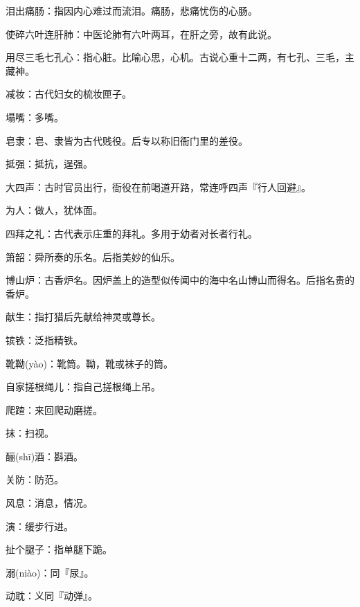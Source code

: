 \startbuffer[1221]
泪出痛肠：指因内心难过而流泪。痛肠，悲痛忧伤的心肠。
\stopbuffer


\startbuffer[1222]
使碎六叶连肝肺：中医论肺有六叶两耳，在肝之旁，故有此说。
\stopbuffer


\startbuffer[1223]
用尽三毛七孔心：指心脏。比喻心思，心机。古说心重十二两，有七孔、三毛，主藏神。
\stopbuffer


\startbuffer[1224]
减妆：古代妇女的梳妆匣子。
\stopbuffer


\startbuffer[1225]
塌嘴：多嘴。
\stopbuffer


\startbuffer[1226]
皂隶：皂、隶皆为古代贱役。后专以称旧衙门里的差役。
\stopbuffer


\startbuffer[1227]
抵强：抵抗，逞强。
\stopbuffer


\startbuffer[1228]
大四声：古时官员出行，衙役在前喝道开路，常连呼四声『行人回避』。
\stopbuffer


\startbuffer[1229]
为人：做人，犹体面。
\stopbuffer


\startbuffer[1230]
四拜之礼：古代表示庄重的拜礼。多用于幼者对长者行礼。
\stopbuffer


\startbuffer[1231]
箫韶：舜所奏的乐名。后指美妙的仙乐。
\stopbuffer


\startbuffer[1232]
博山炉：古香炉名。因炉盖上的造型似传闻中的海中名山博山而得名。后指名贵的香炉。
\stopbuffer


\startbuffer[1233]
献生：指打猎后先献给神灵或尊长。
\stopbuffer


\startbuffer[1234]
镔铁：泛指精铁。
\stopbuffer


\startbuffer[1235]
靴靿(yào)：靴筒。靿，靴或袜子的筒。
\stopbuffer


\startbuffer[1236]
自家搓根绳儿：指自己搓根绳上吊。
\stopbuffer


\startbuffer[1237]
爬蹅：来回爬动磨搓。
\stopbuffer


\startbuffer[1238]
抹：扫视。
\stopbuffer


\startbuffer[1239]
酾(shī)酒：斟酒。
\stopbuffer


\startbuffer[1240]
关防：防范。
\stopbuffer


\startbuffer[1241]
风息：消息，情况。
\stopbuffer


\startbuffer[1242]
演：缓步行进。
\stopbuffer


\startbuffer[1243]
扯个腿子：指单腿下跪。
\stopbuffer


\startbuffer[1244]
溺(niào)：同『尿』。
\stopbuffer


\startbuffer[1245]
动耽：义同『动弹』。
\stopbuffer


